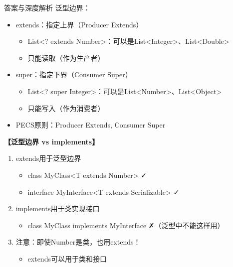 \documentclass[12pt, a4paper]{ctexart}
\begin{document}
\begin{enumerate}[label=\textbf{\arabic*.}]
\begin{bluebox}{答案与深度解析}
		      泛型边界：
		      \begin{itemize}[label={}, leftmargin=*, nosep]
			      \item extends：指定上界（Producer Extends）
			            \begin{itemize}[label={}, leftmargin=*, nosep]
				            \item List<? extends Number>：可以是List<Integer>、List<Double>
				            \item 只能读取（作为生产者）
			            \end{itemize}
			      \item super：指定下界（Consumer Super）
			            \begin{itemize}[label={}, leftmargin=*, nosep]
				            \item List<? super Integer>：可以是List<Number>、List<Object>
				            \item 只能写入（作为消费者）
			            \end{itemize}
			      \item PECS原则：Producer Extends, Consumer Super
		      \end{itemize}

		      \textbf{【泛型边界 vs implements】}

		      \begin{enumerate}[label={}]
			      \item extends用于泛型边界
			            \begin{itemize}[label={}, leftmargin=*, nosep]
				            \item class MyClass<T extends Number> ✓
				            \item interface MyInterface<T extends Serializable> ✓
			            \end{itemize}
			      \item implements用于类实现接口
			            \begin{itemize}[label={}, leftmargin=*, nosep]
				            \item class MyClass implements MyInterface ✗（泛型中不能这样用）
			            \end{itemize}
			      \item 注意：即使Number是类，也用extends！
			            \begin{itemize}[label={}, leftmargin=*, nosep]
				            \item extends可以用于类和接口
			            \end{itemize}
		      \end{enumerate}


\end{bluebox}
\end{enumerate}
\end{document}
